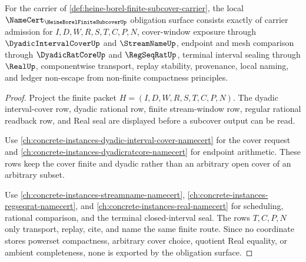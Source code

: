 \begin{theorem}
\label{thm:heine-borel-finite-subcover-obligation-surface}
For the carrier of \autoref{def:heine-borel-finite-subcover-carrier}, the local $\NameCert_{\HeineBorelFiniteSubcoverUp}$ obligation surface consists exactly of carrier admission for $I,D,W,R,S,T,C,P,N$, cover-window exposure through $\DyadicIntervalCoverUp$ and $\StreamNameUp$, endpoint and mesh comparison through $\DyadicRatCoreUp$ and $\RegSeqRatUp$, terminal interval sealing through $\RealUp$, componentwise transport, replay stability, provenance, local naming, and ledger non-escape from non-finite compactness principles.
\end{theorem}
\begin{proof}
Project the finite packet $H=(I,D,W,R,S,T,C,P,N)$. The dyadic interval-cover row, dyadic rational row, finite stream-window row, regular rational readback row, and Real seal are displayed before a subcover output can be read.

Use \autoref{ch:concrete-instances-dyadic-interval-cover-namecert} for the cover request and \autoref{ch:concrete-instances-dyadicratcore-namecert} for endpoint arithmetic. These rows keep the cover finite and dyadic rather than an arbitrary open cover of an arbitrary subset.

Use \autoref{ch:concrete-instances-streamname-namecert}, \autoref{ch:concrete-instances-regseqrat-namecert}, and \autoref{ch:concrete-instances-real-namecert} for scheduling, rational comparison, and the terminal closed-interval seal. The rows $T,C,P,N$ only transport, replay, cite, and name the same finite route. Since no coordinate stores powerset compactness, arbitrary cover choice, quotient Real equality, or ambient completeness, none is exported by the obligation surface.
\end{proof}

